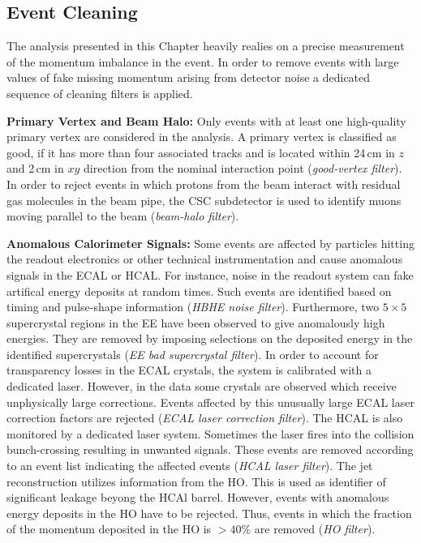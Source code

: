 \subsection{Event Cleaning}
\label{subsec:RA2_cleaning}
The analysis presented in this Chapter heavily realies on a precise measurement of the momentum imbalance in the event. In order to remove events with large values of fake missing momentum arising from detector noise a dedicated sequence of cleaning filters is applied. 
\begin{description}
 \item{\textbf{Primary Vertex and Beam Halo:}} Only events with at least one high-quality primary vertex are considered in the analysis. A primary vertex is classified as good, if it has more than four associated tracks and is located within 24\,cm in $z$ and 2\,cm in $xy$ direction from the nominal interaction point (\textit{good-vertex filter}). In order to reject events in which protons from the beam interact with residual gas molecules in the beam pipe, the CSC subdetector is used to identify muons moving parallel to the beam (\textit{beam-halo filter}).
 \item{\textbf{Anomalous Calorimeter Signals:}} Some events are affected by particles hitting the readout electronics or other technical instrumentation and cause anomalous signals in the ECAL or HCAL. For instance, noise in the readout system can fake artifical energy deposits at random times. Such events are identified based on timing and pulse-shape information (\textit{HBHE noise filter}). Furthermore, two $5 \times 5 $ supercrystal regions in the EE have been observed to give anomalously high energies. They are removed by imposing selections on the deposited energy in the identified supercrystals (\textit{EE bad supercrystal filter}). In order to account for transparency losses in the ECAL crystals, the system is calibrated with a dedicated laser. However, in the data some crystals are observed which receive unphysically large corrections. Events affected by this unusually large ECAL laser correction factors are rejected (\textit{ECAL laser correction filter}). The HCAL is also monitored by a dedicated laser system. Sometimes the laser fires into the collision bunch-crossing resulting in unwanted signals. These events are removed according to an event list indicating the affected events (\textit{HCAL laser filter}). The jet reconstruction utilizes information from the HO. This is used as identifier of significant leakage beyong the HCAl barrel. However, events with anomalous energy deposits in the HO have to be rejected. Thus, events in which the fraction of the momentum deposited in the HO is $> 40\%$ are removed (\textit{HO filter}).

\end{description}
